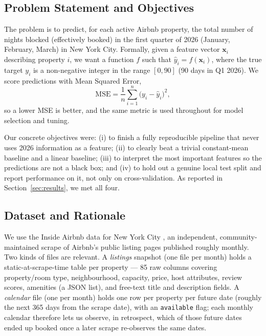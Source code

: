 \documentclass[journal]{IEEEtran}
\begin{document}
\subsection{Problem Statement and Objectives}
The problem is to predict, for each active Airbnb property, the total number of
nights blocked (effectively booked) in the first quarter of 2026 (January,
February, March) in New York City. Formally, given a feature vector
$\mathbf{x}_i$ describing property $i$, we want a function $f$ such that
$\hat y_i = f(\mathbf{x}_i)$, where the true target $y_i$ is a non-negative
integer in the range $[0,90]$ (90 days in Q1 2026). We score predictions with
Mean Squared Error,
\begin{equation}
\text{MSE} = \frac{1}{n}\sum_{i=1}^{n}\big(y_i-\hat y_i\big)^{2},
\label{eq:mse}
\end{equation}
so a lower MSE is better, and the same metric is used throughout for model
selection and tuning.

Our concrete objectives were: (i) to finish a fully reproducible pipeline that
never uses 2026 information as a feature; (ii) to clearly beat a trivial
constant-mean baseline and a linear baseline; (iii) to interpret the most
important features so the predictions are not a black box; and (iv) to hold out
a genuine local test split and report performance on it, not only on
cross-validation. As reported in Section~\ref{sec:results}, we met all four.

\subsection{Dataset and Rationale}
\label{sec:dataset}
We use the Inside Airbnb data for New York City \cite{insideairbnb}, an
independent, community-maintained scrape of Airbnb's public listing pages
published roughly monthly. Two kinds of files are relevant. A \emph{listings}
snapshot (one file per month) holds a static-at-scrape-time table per property
--- 85 raw columns covering property/room type, neighbourhood, capacity, price,
host attributes, review scores, amenities (a JSON list), and free-text title and
description fields. A \emph{calendar} file (one per month) holds one row per
property per future date (roughly the next 365 days from the scrape date), with
an \texttt{available} flag; each monthly calendar therefore lets us observe, in
retrospect, which of those future dates ended up booked once a later scrape
re-observes the same dates.
\end{document}
